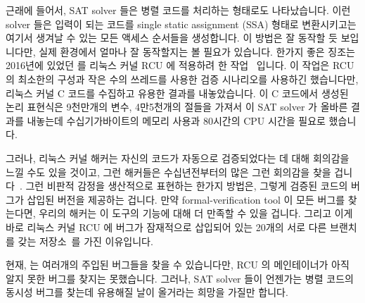 근래에 들어서, SAT solver 들은 병렬 코드를 처리하는 형태로도 나타났습니다.
이런 solver 들은 입력이 되는 코드를 single static assignment (SSA) 형태로
변환시키고는 여기서 생겨날 수 있는 모든 액세스 순서들을 생성합니다.
이 방법은 잘 동작할 듯 보입니다만, 실제 환경에서 얼마나 잘 동작할지는 볼 필요가
있습니다.
한가지 좋은 징조는 2016년에 있었던  를 리눅스 커널 RCU 에 적용하려 한
작업~\cite{LihaoLiang2016VerifyTreeRCU,Liang:2018:VTB,LanceRoy2017CBMC-SRCU}
입니다.
이 작업은 RCU 의 최소한의 구성과 작은 수의 쓰레드를 사용한 검증 시나리오를
사용하긴 했습니다만, 리눅스 커널 C 코드를 수집하고 유용한 결과를 내놓았습니다.
이 C 코드에서 생성된 논리 표현식은 9천만개의 변수, 4만5천개의 절들을 가져서 이
SAT solver 가 올바른 결과를 내놓는데 수십기가바이트의 메모리 사용과 80시간의
CPU 시간을 필요로 했습니다.

그러나, 리눅스 커널 해커는 자신의 코드가 자동으로 검증되었다는 데 대해 회의감을
느낄 수도 있을 것이고, 그런 해커들은 수십년전부터의 많은 그런 회의감을 찾을
겁니다~\cite{DeMillo:1979:SPP:359104.359106}.
그런 비판적 감정을 생산적으로 표현하는 한가지 방법은, 그렇게 검증된 코드의
버그가 삽입된 버전을 제공하는 겁니다.
만약 formal-verification tool 이 모든 버그를 찾는다면, 우리의 해커는 이 도구의
기능에 대해 더 만족할 수 있을 겁니다.
그리고 이게 바로 리눅스 커널 RCU 에 버그가 잠재적으로 삽입되어 있는 20개의 서로
다른 브랜치를 갖는 
저장소~\cite{PaulEMcKenney2017VerificationChallenge6}를 가진 이유입니다.

현재,  는 여러개의 주입된 버그들을 찾을 수 있습니다만, RCU 의
메인테이너가 아직 알지 못한 버그를 찾지는 못했습니다.
그러나, SAT solver 들이 언젠가는 병렬 코드의 동시성 버그를 찾는데 유용해질 날이
올거라는 희망을 가질만 합니다.
\iffalse

